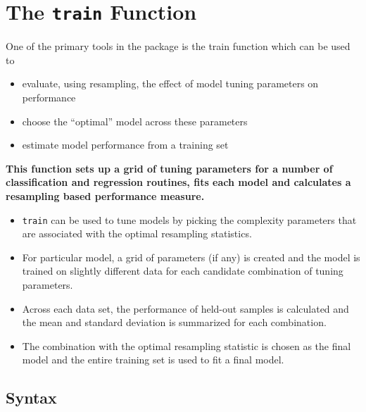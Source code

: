 \documentclass[caret-main.tex]{subfiles}
\begin{document}
\section{The \texttt{train} Function}


One of the primary tools in the package is the train function which can be used to

\begin{itemize}
\item evaluate, using resampling, the eﬀect of model tuning parameters on performance
\item choose the “optimal” model across these parameters
\item estimate model performance from a training set
\end{itemize}

\begin{framed}
\textbf{
\noindent This function sets up a grid of tuning parameters for a number of classification and regression routines, fits each model and calculates a resampling based performance measure.
}
\end{framed}

\begin{itemize}
\item \texttt{train} can be used to tune models by picking the complexity parameters that are associated with the optimal resampling statistics. 
\item For particular model, a grid of parameters (if any) is created and the model is trained on slightly different data for each candidate combination of tuning parameters. 
\item Across each data set, the performance of held-out samples is calculated and the mean and standard deviation is summarized for each combination. 
\item The combination with the optimal resampling statistic is chosen as the final model and the entire training set is used to fit a final model.
\end{itemize}

\newpage
\subsection{Syntax}
\end{document}
